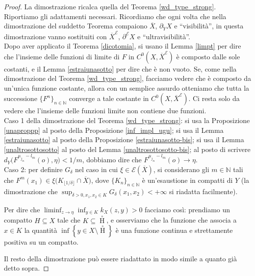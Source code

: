 \begin{proof}
    La dimostrazione ricalca quella del Teorema \ref{wd_type_strong}. Riportiamo gli adattamenti necessari. Ricordiamo che ogni volta che nella dimostrazione del suddetto Teorema compaiono $\overline{X}$, $\partial_YX$ e ``visibilità'', in questa dimostrazione vanno sostituiti con $\overline{X}^\mathcal{E}$, $\partial^\mathcal{E}X$ e ``ultravisibilità''.\\

    Dopo aver applicato il Teorema \ref{dicotomia}, si usano il Lemma \ref{limpt} per dire che l'insieme delle funzioni di limite di $F$ in $C^0(X,\overline{X}^\mathcal{E})$ è composto dalle sole costanti, e il Lemma \ref{estraiunasotto} per dire che è non vuoto. Se, come nella dimostrazione del Teorema \ref{wd_type_strong}, facciamo vedere che è composto da un'unica funzione costante, allora con un semplice assurdo otteniamo che tutta la successione $\{F^n\}_{n\in\mathbb{N}}$ converge a tale costante in $C^0(X,\overline{X}^\mathcal{E})$. Ci resta solo da vedere che l'insieme delle funzioni limite non contiene due funzioni.\\

    Caso 1 della dimostrazione del Teorema \ref{wd_type_strong}: si usa la Proposizione \ref{unaproppp} al posto della Proposizione \ref{inf_impl_ugu}; si usa il Lemma \ref{estraiunasotto} al posto della Proposizione \ref{estraiunasotto-bis}; si usa il Lemma \ref{unaltrosottosotto} al posto del Lemma \ref{unaltrosottosotto-bis}; al posto di scrivere $d_Y\big(F^{\mu_{j_m}-l_m}(o),\eta\big)<1/m$, dobbiamo dire che $F^{\mu_{j_m}-l_m}(o)\longrightarrow \eta$.\\

    Caso 2: per definire $G_\delta$ nel caso in cui $\xi\in\mathcal{E}(\overline{X})$, si considerano gli $m\in\mathbb{N}$ tali che $F^m(x_1)\in\xi\big(K_{\lfloor1/\delta\rfloor}\cap\overline{X}\big)$, dove $\{K_n\}_{n\in\mathbb{N}}$ è un'esaustione in compatti di $Y$ (la dimostrazione che $\displaystyle\sup_{\delta>0,x_1,x_2\in K}G_\delta(x_1,x_2)<+\infty$ si riadatta facilmente).
    
    Per dire che $\displaystyle\liminf_{z \longrightarrow\eta}\inf_{y\in K}k_X(z,y)>0$ facciamo così: prendiamo un compatto $H\subseteq X$ tale che $K\subseteq{\mathop H\limits^ \circ}$, e osserviamo che la funzione che associa a $x\in K$ la quantità $\inf\left\{y\in X\setminus\mathop H\limits^ \circ\right\}$ è una funzione continua e strettamente positiva su un compatto.

    Il resto della dimostrazione può essere riadattato in modo simile a quanto già detto sopra.
\end{proof}

